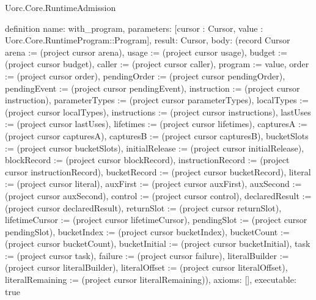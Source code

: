 \begin{lexlean}{Uorc.Core.RuntimeAdmission}
\begin{semanticmodule}
definition{
  name: with_program,
  parameters: [cursor : Cursor, value : Uorc.Core.RuntimeProgram::Program],
  result: Cursor,
  body: (record Cursor {arena := (project cursor arena), usage := (project cursor usage), budget := (project cursor budget), caller := (project cursor caller), program := value, order := (project cursor order), pendingOrder := (project cursor pendingOrder), pendingEvent := (project cursor pendingEvent), instruction := (project cursor instruction), parameterTypes := (project cursor parameterTypes), localTypes := (project cursor localTypes), instructions := (project cursor instructions), lastUses := (project cursor lastUses), lifetimes := (project cursor lifetimes), capturesA := (project cursor capturesA), capturesB := (project cursor capturesB), bucketSlots := (project cursor bucketSlots), initialRelease := (project cursor initialRelease), blockRecord := (project cursor blockRecord), instructionRecord := (project cursor instructionRecord), bucketRecord := (project cursor bucketRecord), literal := (project cursor literal), auxFirst := (project cursor auxFirst), auxSecond := (project cursor auxSecond), control := (project cursor control), declaredResult := (project cursor declaredResult), returnSlot := (project cursor returnSlot), lifetimeCursor := (project cursor lifetimeCursor), pendingSlot := (project cursor pendingSlot), bucketIndex := (project cursor bucketIndex), bucketCount := (project cursor bucketCount), bucketInitial := (project cursor bucketInitial), task := (project cursor task), failure := (project cursor failure), literalBuilder := (project cursor literalBuilder), literalOffset := (project cursor literalOffset), literalRemaining := (project cursor literalRemaining)}),
  axioms: [],
  executable: true
}


\end{semanticmodule}
\end{lexlean}
